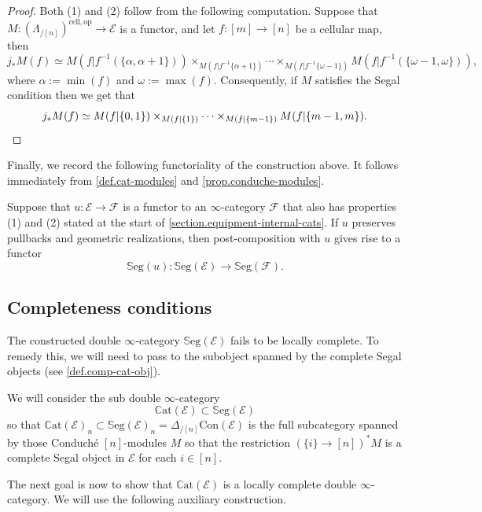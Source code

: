 \documentclass[a4paper, 11pt]{amsart}
\numberwithin{theorem}{section}
\theoremstyle{definition}
\newcommand{\op}{\mathrm{op}}
\newcommand{\E}{\mathscr{E}}
\newcommand{\F}{\mathscr{F}}
\newcommand{\Con}{\mathrm{Con}}
\newcommand{\SSEG}{\mathbb{S}\mathrm{eg}}
\newcommand{\CCAT}{\mathbb{C}\mathrm{at}}
\begin{document}
\begin{proof}
	Both (1) and (2) follow from the following computation. Suppose that 
	 $M : (\Lambda_{/[n]})^{\mathrm{cell}, \op} \rightarrow \E$ is a functor, and let $f : [m] \rightarrow [n]$ be a cellular map, then 
	$$
	j_*M(f) \simeq M(f|f^{-1}(\{\alpha, \alpha+1\})) \times_{M(f|f^{-1}\{\alpha+1\})} \dotsb \times_{M(f|f^{-1}\{\omega-1\})} M(f|f^{-1}(\{\omega-1,\omega\})),
	$$
	where $\alpha := \min(f)$ and $\omega := \max(f)$. 
	Consequently, if $M$ satisfies the Segal condition then we get that
	\begin{displaymath}
	j_*M(f) \simeq M(f|\{0,1\}) \times_{M(f|\{1\})} \dotsb \times_{M(f|\{m-1\})} M(f|\{m-1,m\}). \qedhere
	\end{displaymath}
\end{proof}

Finally, we record the following functoriality of the construction above. It follows immediately from \cref{def.cat-modules} and \cref{prop.conduche-modules}.

\begin{proposition}\label{prop.int-ccat-functoriality}
	Suppose that $u : \E \rightarrow \F$ is a functor to an $\infty$-category $\F$ that also has properties (1) and (2) stated at the start of \cref{section.equipment-internal-cats}. 
	If $u$ preserves pullbacks and geometric realizations, then post-composition with $u$ gives 
	rise to a functor $$\SSEG(u) : \SSEG(\E) \rightarrow \SSEG(\F).$$
\end{proposition}	

\subsection{Completeness conditions} The constructed double $\infty$-category $\SSEG(\E)$ fails to be locally complete. To remedy this, we will need 
to pass to the subobject spanned by the complete Segal objects (see \cref{def.comp-cat-obj}).


\begin{construction}\label{con.equipment-int-ccat}
	We will consider the sub double $\infty$-category
	$$
	\CCAT(\E) \subset \SSEG(\E)
	$$
	so that $\CCAT(\E)_n \subset \SSEG(\E)_n = \Delta_{/[n]}\Con(\E)$ is the full subcategory spanned by those Conduch\'e $[n]$-modules 
	$M$ so that the restriction $(\{i\} \to [n])^*M$ is a complete Segal object in $\E$ for each $i \in [n]$. 
\end{construction}

The next goal is now to show that $\CCAT(\E)$ is a locally complete double $\infty$-category. We will use the following auxiliary construction.
\end{document}
